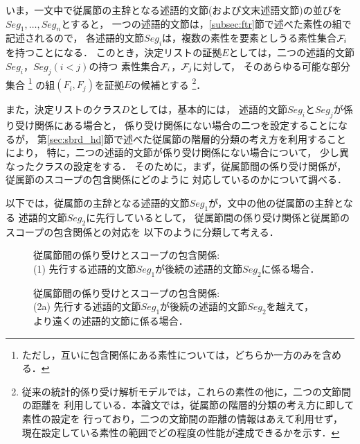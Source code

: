 いま，一文中で従属節の主辞となる述語的文節(および文末述語文節)の並びを$Seg_1,\ldots,Seg_n$とすると，
一つの述語的文節は，\ref{subsec:ftr}節で述べた素性の組で記述されるので，
各述語的文節$Seg_i$は，複数の素性を要素としうる素性集合${\cal F}_i$を持つことになる．
このとき，決定リストの証拠$E$としては，二つの述語的文節$Seg_i$，$Seg_j (i<j)$の持つ
素性集合${\cal F}_i$，${\cal F}_j$に対して，
そのあらゆる可能な部分集合
\footnote{
  ただし，互いに包含関係にある素性については，どちらか一方のみを含める．
}
の組$(F_i,F_j)$を証拠$E$の候補とする
\footnote{
  従来の統計的係り受け解析モデルでは，これらの素性の他に，二つの文節間の距離を
  利用している．本論文では，従属節の階層的分類の考え方に即して素性の設定を
  行っており，二つの文節間の距離の情報はあえて利用せず，
  現在設定している素性の範囲でどの程度の性能が達成できるかを示す．
}．

また，決定リストのクラス$D$としては，基本的には，
述語的文節$Seg_i$と$Seg_j$が係り受け関係にある場合と，
係り受け関係にない場合の二つを設定することになるが，
第\ref{sec:sbrd_hd}節で述べた従属節の階層的分類の考え方を利用することにより，
特に，二つの述語的文節が係り受け関係にない場合について，
少し異なったクラスの設定をする．
そのために，まず，従属節間の係り受け関係が，従属節のスコープの包含関係にどのように
対応しているのかについて調べる．


以下では，従属節の主辞となる述語的文節$Seg_1$が，文中の他の従属節の主辞となる
述語的文節$Seg_2$に先行しているとして，
従属節間の係り受け関係と従属節のスコープの包含関係との対応を
以下のように分類して考える．



\begin{figure}
   \hspace*{-1.5cm}  
\begin{center}
\caption{従属節間の係り受けとスコープの包含関係:\\ (1) 先行する述語的文節$Seg_1$が後続の述語的文節$Seg_2$に係る場合．}
\label{fig:rel1}
\end{center}
\end{figure}

\begin{figure}
\vspace{-8mm}
   \hspace*{-1cm}  
\begin{center}
  \caption{従属節間の係り受けとスコープの包含関係:\\ 
	(2a) 先行する述語的文節$Seg_1$が後続の述語的文節$Seg_2$を越えて，\\
		より遠くの述語的文節に係る場合． }
  \label{fig:rel2a}
\end{center}
\vspace{-2mm}
\end{figure}




